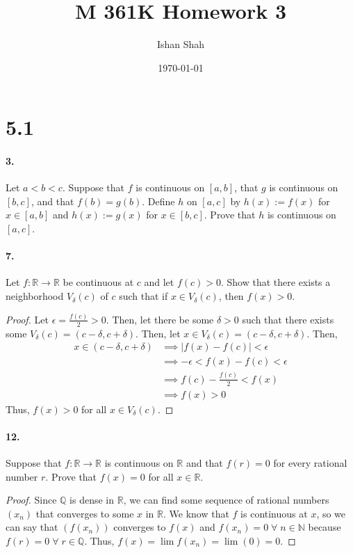 \documentclass[12pt]{article}
\newcommand\R{\mathbb{R}}
\newcommand\N{\mathbb{N}}
\newcommand\Q{\mathbb{Q}}
\theoremstyle{remark}
\begin{document}
\title{M 361K Homework 3}
\author{Ishan Shah}
\date{\today}
\maketitle

\section*{5.1}
\paragraph{3.} Let $a<b<c$. Suppose that $f$ is continuous on $[a, b]$, that $g$ is continuous on $[b, c]$, and that $f(b)=g(b)$. Define $h$ on $[a, c]$ by $h(x):=f(x)$ for $x \in[a, b]$ and $h(x):=g(x)$ for $x \in[b, c]$. Prove that $h$ is continuous on $[a, c]$.

\paragraph{7.} Let $f: \mathbb{R} \rightarrow \mathbb{R}$ be continuous at $c$ and let $f(c)>0$. Show that there exists a neighborhood $V_\delta(c)$ of $c$ such that if $x \in V_\delta(c)$, then $f(x)>0$.
\begin{proof}
    Let $\epsilon = \frac{f(c)}{2} > 0$. Then, let there be some $\delta > 0$ such that there exists some $V_\delta(c) = (c - \delta, c + \delta)$. Then, let $x \in V_\delta(c) = (c - \delta, c + \delta)$. Then,
    \begin{align*}
        x \in (c - \delta, c + \delta) &\implies |f(x) - f(c)| < \epsilon \\
        &\implies -\epsilon < f(x) - f(c) < \epsilon \\
        &\implies f(c) - \frac{f(c)}{2} < f(x) \\
        &\implies f(x) > 0
    \end{align*}
    Thus, $f(x) > 0$ for all $x \in V_\delta(c)$.
\end{proof}

\paragraph{12.} Suppose that $f: \mathbb{R} \rightarrow \mathbb{R}$ is continuous on $\mathbb{R}$ and that $f(r)=0$ for every rational number $r$. Prove that $f(x)=0$ for all $x \in \mathbb{R}$.
\begin{proof}
    Since $\Q$ is dense in $\R$, we can find some sequence of rational numbers $(x_n)$ that converges to some $x$ in $\R$. We know that $f$ is continuous at $x$, so we can say that $(f(x_n))$ converges to $f(x)$ and $f(x_n) = 0 \;\forall\; n \in \N$ because $f(r) = 0 \;\forall\; r \in \Q$. Thus, $f(x) = \lim f(x_n) = \lim(0) = 0$.
\end{proof}
\end{document}
